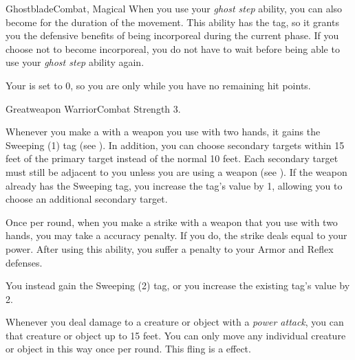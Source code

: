 \begin{magicalfeat}{Ghostblade}{Combat, Magical}
     When you use your \textit{ghost step} ability, you can also become  for the duration of the movement.
    This ability has the  tag, so it grants you the defensive benefits of being incorporeal during the current phase.
    If you choose not to become incorporeal, you do not have to wait  before being able to use your \textit{ghost step} ability again.

     Your  is set to 0, so you are only  while you have no remaining hit points.
  \end{magicalfeat}

  \begin{feat}{Greatweapon Warrior}{Combat}
    \featpre Strength 3.

     Whenever you make a   with a weapon you use with two hands, it gains the Sweeping (1) tag (see ).
    In addition, you can choose secondary targets within 15 feet of the primary target instead of the normal 10 feet.
    Each secondary target must still be adjacent to you unless you are using a  weapon (see ).
    If the weapon already has the Sweeping tag, you increase the tag's value by 1, allowing you to choose an additional secondary target.

     Once per round, when you make a  strike with a weapon that you use with two hands, you may take a  accuracy penalty.
    If you do, the strike deals  equal to your power.
    After using this ability, you  suffer a  penalty to your Armor and Reflex defenses.

     You instead gain the Sweeping (2) tag, or you increase the existing tag's value by 2.

     Whenever you deal damage to a creature or object with a \textit{power attack}, you can  that creature or object up to 15 feet.
    You can only move any individual creature or object in this way once per round.
    This fling is a \atSizeBased effect.
  \end{feat}

